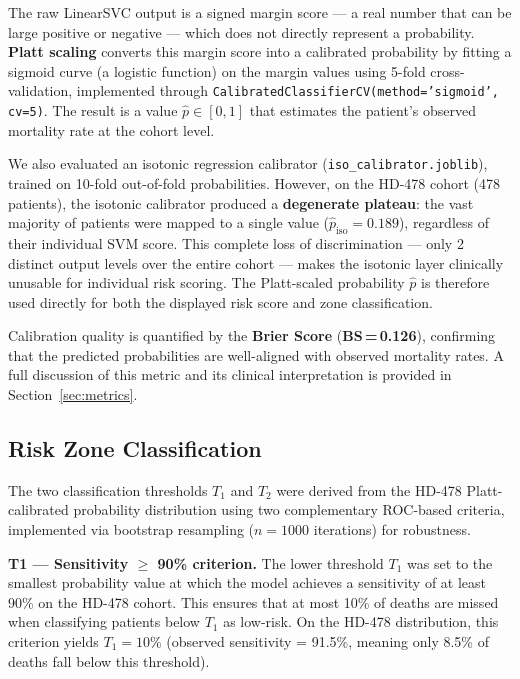 \documentclass[12pt,a4paper,twoside]{report}
\begin{document}
The raw LinearSVC output is a signed margin score — a real number that can be large positive or negative — which does not directly represent a probability. \textbf{Platt scaling} \cite{platt1999} converts this margin score into a calibrated probability by fitting a sigmoid curve (a logistic function) on the margin values using 5-fold cross-validation, implemented through \texttt{CalibratedClassifierCV(method='sigmoid', cv=5)}. The result is a value $\hat{p} \in [0,1]$ that estimates the patient's observed mortality rate at the cohort level.

We also evaluated an isotonic regression calibrator \cite{zadrozny_isotonic_2002} (\texttt{iso\_calibrator.joblib}), trained on 10-fold out-of-fold probabilities. However, on the HD-478 cohort (478 patients), the isotonic calibrator produced a \textbf{degenerate plateau}: the vast majority of patients were mapped to a single value ($\hat{p}_{\text{iso}} = 0.189$), regardless of their individual SVM score. This complete loss of discrimination — only 2 distinct output levels over the entire cohort — makes the isotonic layer clinically unusable for individual risk scoring. The Platt-scaled probability $\hat{p}$ is therefore used directly for both the displayed risk score and zone classification.

Calibration quality is quantified by the \textbf{Brier Score} (\textbf{BS\,=\,0.126}), confirming that the predicted probabilities are well-aligned with observed mortality rates. A full discussion of this metric and its clinical interpretation is provided in Section~\ref{sec:metrics}.

\subsection{Risk Zone Classification}

The two classification thresholds $T_1$ and $T_2$ were derived from the HD-478 Platt-calibrated probability distribution using two complementary ROC-based criteria, implemented via bootstrap resampling ($n = 1000$ iterations) for robustness.

\medskip
\noindent\textbf{T1 — Sensitivity $\geq$ 90\% criterion.} The lower threshold $T_1$ was set to the smallest probability value at which the model achieves a sensitivity of at least 90\% on the HD-478 cohort. This ensures that at most 10\% of deaths are missed when classifying patients below $T_1$ as low-risk. On the HD-478 distribution, this criterion yields $T_1 = 10\%$ (observed sensitivity = 91.5\%, meaning only 8.5\% of deaths fall below this threshold).
\end{document}
